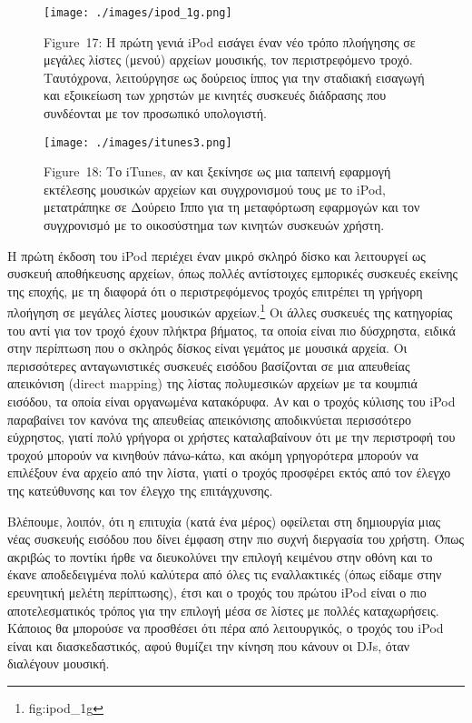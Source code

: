 \documentclass[
]{article}
\begin{document}
\leavevmode{}%
\begin{figure}
\hypertarget{fig:ipod_1g}{%
\centering
\texttt{[image: ./images/ipod\_1g.png]}
\caption{Figure~17: Η πρώτη γενιά iPod εισάγει έναν νέο τρόπο πλοήγησης
σε μεγάλες λίστες (μενού) αρχείων μουσικής, τον περιστρεφόμενο τροχό.
Ταυτόχρονα, λειτούργησε ως δούρειος ίππος για την σταδιακή εισαγωγή και
εξοικείωση των χρηστών με κινητές συσκευές διάδρασης που συνδέονται με
τον προσωπικό υπολογιστή.}\label{fig:ipod_1g}
}
\end{figure}

\leavevmode{}%
\begin{figure}
\hypertarget{fig:itunes3}{%
\centering
\texttt{[image: ./images/itunes3.png]}
\caption{Figure~18: Το iTunes, αν και ξεκίνησε ως μια ταπεινή εφαρμογή
εκτέλεσης μουσικών αρχείων και συγχρονισμού τους με το iPod, μετατράπηκε
σε Δούρειο Ίππο για τη μεταφόρτωση εφαρμογών και τον συγχρονισμό με το
οικοσύστημα των κινητών συσκευών χρήστη.}\label{fig:itunes3}
}
\end{figure}

Η πρώτη έκδοση του iPod περιέχει έναν μικρό σκληρό δίσκο και λειτουργεί
ως συσκευή αποθήκευσης αρχείων, όπως πολλές αντίστοιχες εμπορικές
συσκευές εκείνης της εποχής, με τη διαφορά ότι ο περιστρεφόμενος τροχός
επιτρέπει τη γρήγορη πλοήγηση σε μεγάλες λίστες μουσικών
αρχείων.\footnote{fig:ipod\_1g} Οι άλλες συσκευές της κατηγορίας του
αντί για τον τροχό έχουν πλήκτρα βήματος, τα οποία είναι πιο δύσχρηστα,
ειδικά στην περίπτωση που ο σκληρός δίσκος είναι γεμάτος με μουσικά
αρχεία. Οι περισσότερες ανταγωνιστικές συσκευές εισόδου βασίζονται σε
μια απευθείας απεικόνιση (direct mapping) της λίστας πολυμεσικών αρχείων
με τα κουμπιά εισόδου, τα οποία είναι οργανωμένα κατακόρυφα. Αν και ο
τροχός κύλισης του iPod παραβαίνει τον κανόνα της απευθείας απεικόνισης
αποδικνύεται περισσότερο εύχρηστος, γιατί πολύ γρήγορα οι χρήστες
καταλαβαίνουν ότι με την περιστροφή του τροχού μπορούν να κινηθούν
πάνω-κάτω, και ακόμη γρηγορότερα μπορούν να επιλέξουν ένα αρχείο από την
λίστα, γιατί ο τροχός προσφέρει εκτός από τον έλεγχο της κατεύθυνσης και
τον έλεγχο της επιτάγχυνσης.

Βλέπουμε, λοιπόν, ότι η επιτυχία (κατά ένα μέρος) οφείλεται στη
δημιουργία μιας νέας συσκευής εισόδου που δίνει έμφαση στην πιο συχνή
διεργασία του χρήστη. Όπως ακριβώς το ποντίκι ήρθε να διευκολύνει την
επιλογή κειμένου στην οθόνη και το έκανε αποδεδειγμένα πολύ καλύτερα από
όλες τις εναλλακτικές (όπως είδαμε στην ερευνητική μελέτη περίπτωσης),
έτσι και ο τροχός του πρώτου iPod είναι ο πιο αποτελεσματικός τρόπος για
την επιλογή μέσα σε λίστες με πολλές καταχωρήσεις. Κάποιος θα μπορούσε
να προσθέσει ότι πέρα από λειτουργικός, ο τροχός του iPod είναι και
διασκεδαστικός, αφού θυμίζει την κίνηση που κάνουν οι DJs, όταν
διαλέγουν μουσική.
\end{document}
